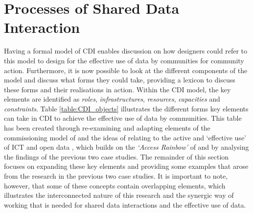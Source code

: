 \section{Processes of Shared Data Interaction}
\label{sec:cdi_process}
Having a formal model of CDI enables discussion on how designers could refer to this model to design for the effective use of data by communities for community action. Furthermore, it is now possible to look at the different components of the model and discuss what forms they could take, providing a lexicon to discuss these forms and their realisations in action. Within the CDI model, the key elements are identified as \textit{roles}, \textit{infrastructures}, \textit{resources}, \textit{capacities} and \textit{constraints}. Table \ref{table:CDI_objects} illustrates the different forms key elements can take in CDI to achieve the effective use of data by communities. This table has been created through re-examining and adapting elements of the commissioning model of \citet{garbett_designing_2017} and the ideas of \citet{gurstein_effective_2003} relating to the active and `effective use' of ICT and open data \citep{gurstein_open_2011}, which builds on the \textit{`Access Rainbow'} of \citet{clement_access_1998} and by analysing the findings of the previous two case studies. The remainder of this section focuses on expanding these key elements and providing some examples that arose from the research in the previous two case studies. It is important to note, however, that some of these concepts contain overlapping elements, which illustrates the interconnected nature of this research and the synergic way of working that is needed for shared data interactions and the effective use of data.

